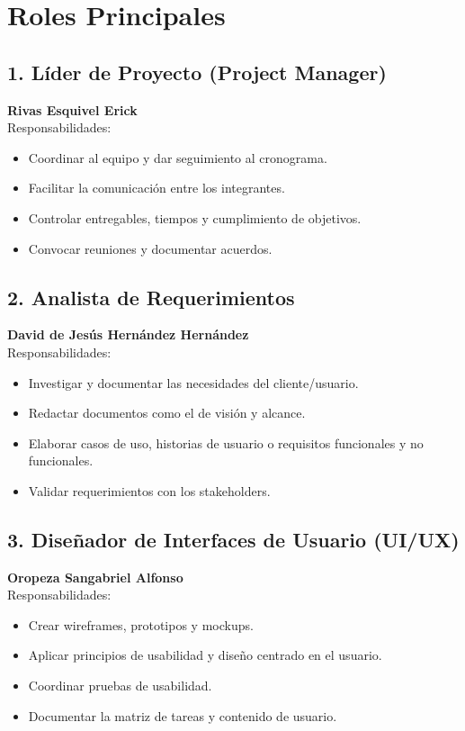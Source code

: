 \section{Roles Principales}
\begingroup
\small

\subsection*{1. Líder de Proyecto (Project Manager)}
\textbf{Rivas Esquivel Erick}\\
Responsabilidades:
\begin{itemize}
    \item Coordinar al equipo y dar seguimiento al cronograma.
    \item Facilitar la comunicación entre los integrantes.
    \item Controlar entregables, tiempos y cumplimiento de objetivos.
    \item Convocar reuniones y documentar acuerdos.
\end{itemize}

\subsection*{2. Analista de Requerimientos}
\textbf{David de Jesús Hernández Hernández}\\
Responsabilidades:
\begin{itemize}
    \item Investigar y documentar las necesidades del cliente/usuario.
    \item Redactar documentos como el de visión y alcance.
    \item Elaborar casos de uso, historias de usuario o requisitos funcionales y no funcionales.
    \item Validar requerimientos con los stakeholders.
\end{itemize}

\subsection*{3. Diseñador de Interfaces de Usuario (UI/UX)}
\textbf{Oropeza Sangabriel Alfonso}\\
Responsabilidades:
\begin{itemize}
    \item Crear wireframes, prototipos y mockups.
    \item Aplicar principios de usabilidad y diseño centrado en el usuario.
    \item Coordinar pruebas de usabilidad.
    \item Documentar la matriz de tareas y contenido de usuario.
\end{itemize}

